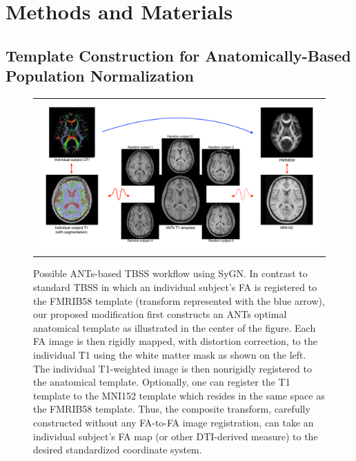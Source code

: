 \documentclass[final,5p,times,twocolumn]{elsarticle}
\begin{document}
\section{Methods and Materials}

\subsection{Template Construction for Anatomically-Based Population Normalization}

\begin{figure}
\begin{center}
\begin{tabular}{c}
  \includegraphics[width=170mm]{workflow.pdf}
\end{tabular}
\caption{Possible ANTs-based TBSS workflow using SyGN.  In contrast to standard TBSS in which an individual subject's FA is registered to the FMRIB58 template
(transform represented with the blue arrow), our proposed modification first constructs an ANTs optimal anatomical template as illustrated in the center of the figure.  Each FA image is then rigidly mapped, with distortion correction, to the individual T1 using the white matter mask as shown on the left.  The individual T1-weighted image is then nonrigidly registered to the anatomical template.  Optionally, one can register the T1 template to the MNI152 template which resides in the same space as the FMRIB58 template.  Thus, the composite transform, carefully constructed without any FA-to-FA image registration, can take an individual subject's FA map (or other DTI-derived measure) to the desired standardized coordinate system.    }
\label{fig:workflow}
\end{center}
\end{figure}
\end{document}
